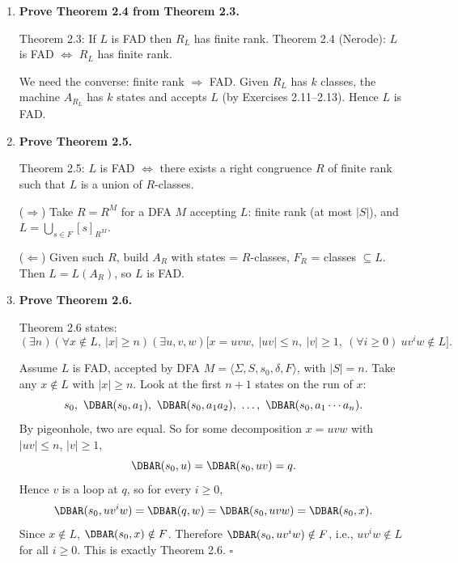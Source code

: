 \begin{enumerate}[{2.}1.]
\begin{enumerate}
\item Such a language cannot be FAD: $R_L=I$ has infinite rank (one class per string in $\{\mathbf{a}\}^*$), so by Nerode's theorem $L$ is not FAD. $\square$
\end{enumerate}

\item \textbf{Prove Theorem 2.4 from Theorem 2.3.}

Theorem 2.3: If $L$ is FAD then $R_L$ has finite rank. Theorem 2.4 (Nerode): $L$ is FAD $\Leftrightarrow$ $R_L$ has finite rank.

We need the converse: finite rank $\Rightarrow$ FAD. Given $R_L$ has $k$ classes, the machine $A_{R_L}$ has $k$ states and accepts $L$ (by Exercises 2.11--2.13). Hence $L$ is FAD.

\item \textbf{Prove Theorem 2.5.}

Theorem 2.5: $L$ is FAD $\Leftrightarrow$ there exists a right congruence $R$ of finite rank such that $L$ is a union of $R$-classes.

($\Rightarrow$) Take $R=R^M$ for a DFA $M$ accepting $L$: finite rank (at most $|S|$), and $L=\bigcup_{s\in F}[s]_{R^M}$.

($\Leftarrow$) Given such $R$, build $A_R$ with states = $R$-classes, $F_R$ = classes $\subseteq L$. Then $L=L(A_R)$, so $L$ is FAD.

\item \textbf{Prove Theorem 2.6.}

Theorem 2.6 states:
\[
(\exists n)(\forall x\notin L,\ |x|\ge n)(\exists u,v,w)\bigl[x=uvw,\ |uv|\le n,\ |v|\ge1,\ (\forall i\ge0)\ uv^iw\notin L\bigr].
\]

Assume $L$ is FAD, accepted by DFA $M=\langle\Sigma,S,s_0,\delta,F\rangle$, with $|S|=n$.
Take any $x\notin L$ with $|x|\ge n$.
Look at the first $n+1$ states on the run of $x$:
\[
s_0,\ \DBAR(s_0,a_1),\ \DBAR(s_0,a_1a_2),\ \ldots,\ \DBAR(s_0,a_1\cdots a_n).
\]
By pigeonhole, two are equal. So for some decomposition $x=uvw$ with $|uv|\le n$, $|v|\ge1$,
\[
\DBAR(s_0,u)=\DBAR(s_0,uv)=q.
\]
Hence $v$ is a loop at $q$, so for every $i\ge0$,
\[
\DBAR(s_0,uv^iw)=\DBAR(q,w)=\DBAR(s_0,uvw)=\DBAR(s_0,x).
\]
Since $x\notin L$, $\DBAR(s_0,x)\notin F$. Therefore $\DBAR(s_0,uv^iw)\notin F$, i.e.,
$uv^iw\notin L$ for all $i\ge0$. This is exactly Theorem 2.6. $\square$


\end{enumerate}
